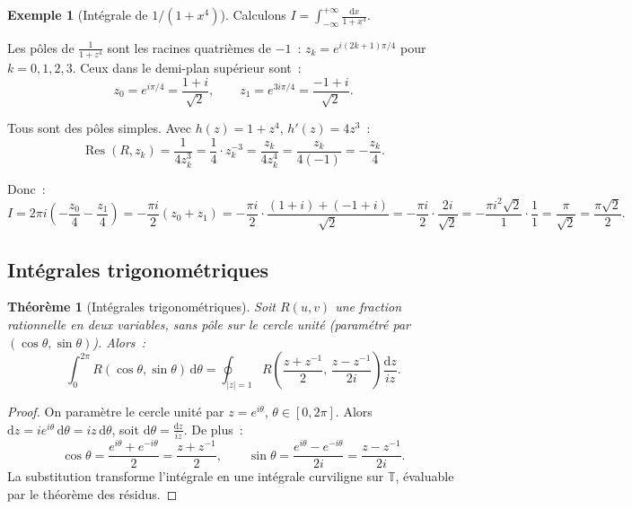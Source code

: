 \documentclass[12pt,a4paper,openany]{book}
\theoremstyle{definition}
\newtheorem{exemple}[definition]{Exemple}
\theoremstyle{plain}
\newtheorem{theoreme}[definition]{Théorème}
\theoremstyle{remark}
\newcommand{\T}{\mathbb{T}}
\DeclareMathOperator{\Res}{Res}
\newcommand{\dd}{\mathrm{d}}
\newcommand{\abs}[1]{\left|#1\right|}
\begin{document}
\begin{exemple}[Intégrale de $1/(1+x^4)$]\label{ex:int-1-plus-x4}
Calculons $\displaystyle I = \int_{-\infty}^{+\infty} \frac{\dd x}{1 + x^4}$.

Les pôles de $\frac{1}{1+z^4}$ sont les racines quatrièmes de $-1$~:
$z_k = e^{i(2k+1)\pi/4}$ pour $k = 0, 1, 2, 3$. Ceux dans le demi-plan
supérieur sont~:
\[
  z_0 = e^{i\pi/4} = \frac{1+i}{\sqrt{2}}, \qquad
  z_1 = e^{3i\pi/4} = \frac{-1+i}{\sqrt{2}}.
\]

Tous sont des pôles simples. Avec $h(z) = 1 + z^4$, $h'(z) = 4z^3$~:
\[
  \Res(R, z_k) = \frac{1}{4z_k^3} = \frac{1}{4} \cdot z_k^{-3} = \frac{z_k}{4z_k^4} = \frac{z_k}{4(-1)} = -\frac{z_k}{4}.
\]

Donc~:
\[
  I = 2\pi i \left(-\frac{z_0}{4} - \frac{z_1}{4}\right)
  = -\frac{\pi i}{2}(z_0 + z_1)
  = -\frac{\pi i}{2} \cdot \frac{(1+i)+(-1+i)}{\sqrt{2}}
  = -\frac{\pi i}{2} \cdot \frac{2i}{\sqrt{2}}
  = -\frac{\pi i^2 \sqrt{2}}{1} \cdot\frac{1}{1}
  = \frac{\pi}{\sqrt{2}} = \frac{\pi\sqrt{2}}{2}.
\]
\end{exemple}

\subsection{Intégrales trigonométriques}\label{subsec:int-trig}

\begin{theoreme}[Intégrales trigonométriques]\label{thm:int-trig}
Soit $R(u,v)$ une fraction rationnelle en deux variables, sans pôle sur le cercle
unité (paramétré par $(\cos\theta, \sin\theta)$). Alors~:
\[
  \int_0^{2\pi} R(\cos\theta, \sin\theta)\, \dd\theta
  = \oint_{\abs{z}=1} R\!\left(\frac{z+z^{-1}}{2},\, \frac{z-z^{-1}}{2i}\right)
  \frac{\dd z}{iz}.
\]
\end{theoreme}

\begin{proof}
On paramètre le cercle unité par $z = e^{i\theta}$, $\theta \in [0, 2\pi]$.
Alors $\dd z = ie^{i\theta}\,\dd\theta = iz\,\dd\theta$, soit
$\dd\theta = \frac{\dd z}{iz}$. De plus~:
\[
  \cos\theta = \frac{e^{i\theta}+e^{-i\theta}}{2} = \frac{z+z^{-1}}{2}, \qquad
  \sin\theta = \frac{e^{i\theta}-e^{-i\theta}}{2i} = \frac{z-z^{-1}}{2i}.
\]
La substitution transforme l'intégrale en une intégrale curviligne sur $\T$,
évaluable par le théorème des résidus.
\end{proof}
\end{document}
